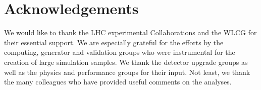\documentclass[11pt,twoside,a4paper]{cernrep}
\begin{document}
\begin{titlepage}
\vspace*{2.0cm}

\begin{center}
{\it }
\end{center}


\vspace*{2.0cm}
\vspace{\fill}

\end{titlepage}

\setcounter{tocdepth}{3}
\tableofcontents
\newpage

\newpage

\newpage

\newpage

\newpage

\newpage

\newpage

\newpage

\newpage

\newpage

\newpage

\section*{Acknowledgements}
We would like to thank the LHC experimental Collaborations and the WLCG for their essential support.
We are especially grateful for the efforts by the computing, generator and validation groups who were
instrumental for the creation of large simulation samples. We thank the detector upgrade groups as well
as the physics and performance groups for their input.  Not least, we thank the many colleagues who
have provided useful comments on the analyses.



\end{document}
